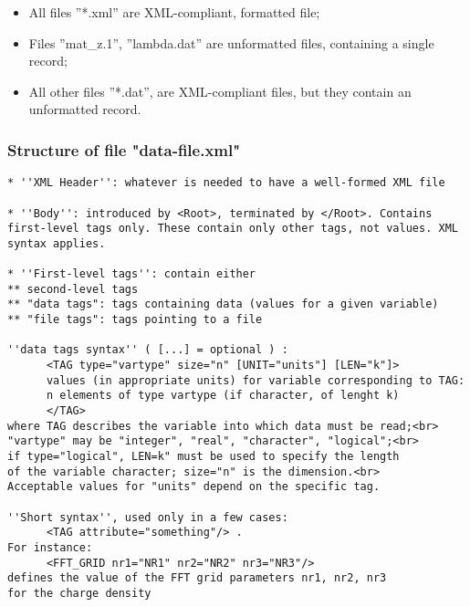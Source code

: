\documentclass[12pt,a4paper]{article}
\begin{document}
\begin{itemize}
\item All files ''*.xml'' are XML-compliant, formatted file;
\item Files ''mat\_z.1'', ''lambda.dat'' are unformatted files, containing a single record;
\item All other files ''*.dat'', are XML-compliant files, but they contain an unformatted record.
\end{itemize}

\subsubsection{ Structure of file "data-file.xml"}
\begin{verbatim}
* ''XML Header'': whatever is needed to have a well-formed XML file

* ''Body'': introduced by <Root>, terminated by </Root>. Contains first-level tags only. These contain only other tags, not values. XML syntax applies.

* ''First-level tags'': contain either
** second-level tags
** "data tags": tags containing data (values for a given variable)
** "file tags": tags pointing to a file

''data tags syntax'' ( [...] = optional ) :
      <TAG type="vartype" size="n" [UNIT="units"] [LEN="k"]>
      values (in appropriate units) for variable corresponding to TAG:
      n elements of type vartype (if character, of lenght k)
      </TAG>
where TAG describes the variable into which data must be read;<br>
"vartype" may be "integer", "real", "character", "logical";<br>
if type="logical", LEN=k" must be used to specify the length
of the variable character; size="n" is the dimension.<br>
Acceptable values for "units" depend on the specific tag.

''Short syntax'', used only in a few cases:
      <TAG attribute="something"/> . 
For instance:
      <FFT_GRID nr1="NR1" nr2="NR2" nr3="NR3"/>
defines the value of the FFT grid parameters nr1, nr2, nr3
for the charge density
\end{verbatim}
\end{document}

